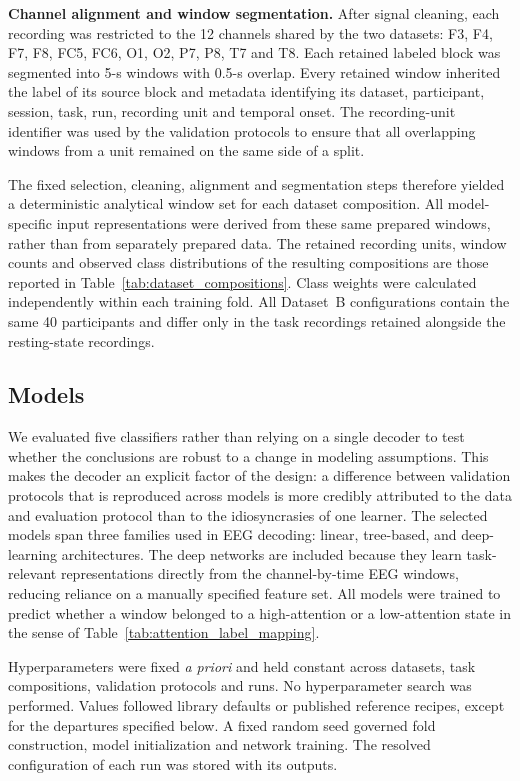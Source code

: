 \documentclass[10pt,letterpaper]{article}
\newcommand{\rev}[1]{#1}
\newcommand{\revs}[1]{#1}
\begin{document}
\rev{\textbf{Channel alignment and window segmentation.} After signal cleaning, each
recording was restricted to the 12 channels shared by
the two datasets: F3, F4, F7, F8, FC5, FC6, O1, O2, P7, P8, T7 and T8. Each
retained labeled block was segmented into 5-s windows with 0.5-s overlap.
Every retained window inherited the label of its source block and metadata identifying its
dataset, participant, session, task, run, recording unit and temporal onset.
The recording-unit identifier was used by the validation protocols to ensure
that all overlapping windows from a unit remained on the same side of a split.}

\rev{The fixed selection, cleaning, alignment and segmentation steps therefore
yielded a deterministic analytical window set for each dataset composition.
All model-specific input representations were derived from these same prepared
windows, rather than from separately prepared data. The retained recording
units, window counts and observed class distributions of the resulting
compositions are those reported in Table~\ref{tab:dataset_compositions}. Class weights were calculated
independently within each training fold. All Dataset~B configurations contain the same 40 participants and
differ only in the task recordings retained alongside the resting-state
recordings.}

\subsection*{\revs{Models}}

\rev{We evaluated five classifiers rather than relying on a single decoder to
test whether the conclusions are robust to a change in modeling assumptions.
This makes the decoder an explicit factor of the design: a difference between
validation protocols that is reproduced across models is more credibly
attributed to the data and evaluation protocol than to the idiosyncrasies of
one learner. The selected models span three families used in EEG decoding:
linear, tree-based, and deep-learning architectures. The deep networks are
included because they learn task-relevant representations directly from the
channel-by-time EEG windows, reducing reliance on a manually specified feature
set. All models were trained to predict whether a window belonged to a
high-attention or a low-attention state in the sense of
Table~\ref{tab:attention_label_mapping}.}

\rev{Hyperparameters were fixed \textit{a priori} and held constant across
datasets, task compositions, validation protocols and runs. No hyperparameter
search was performed. Values followed library defaults or published reference
recipes, except for the departures specified below. A fixed random seed
governed fold construction, model initialization and network training. The
resolved configuration of each run was stored with its outputs.}
\end{document}

